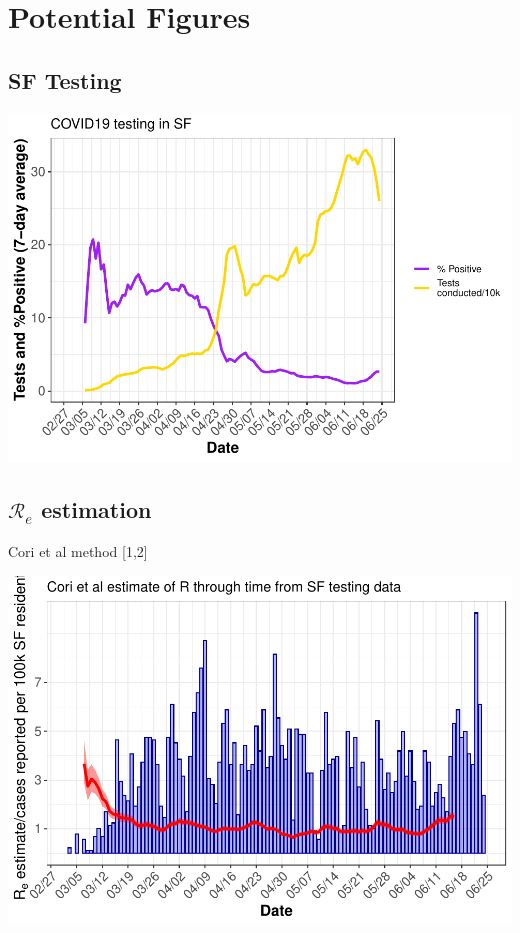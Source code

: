 \documentclass[
]{article}
\begin{document}
\hypertarget{potential-figures}{%
\section{Potential Figures}\label{potential-figures}}

\hypertarget{sf-testing}{%
\subsection{SF Testing}\label{sf-testing}}

\includegraphics{Testing_Writeup_files/figure-latex/sf_test_plot-1.pdf}

\hypertarget{mathcalr_e-estimation}{%
\subsection{\texorpdfstring{\(\mathcal{R}_e\)
estimation}{\textbackslash mathcal\{R\}\_e estimation}}\label{mathcalr_e-estimation}}

Cori et al method {[}1,2{]}

\includegraphics{Testing_Writeup_files/figure-latex/cori_Re-1.pdf}
\end{document}
